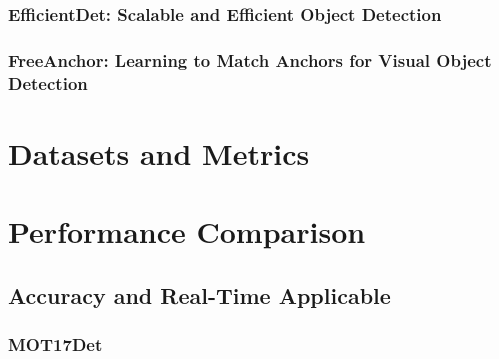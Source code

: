 \documentclass[12pt, oneside]{article}
\begin{document}
\subsubsection{EfficientDet: Scalable and Efficient Object Detection}

\vfill

\subsubsection{FreeAnchor: Learning to Match Anchors for Visual Object Detection}

\section{Datasets and Metrics}

\vfill

\section{Performance Comparison}

\vfill

\subsection{Accuracy and Real-Time Applicable}


\subsubsection{MOT17Det}
\end{document}
